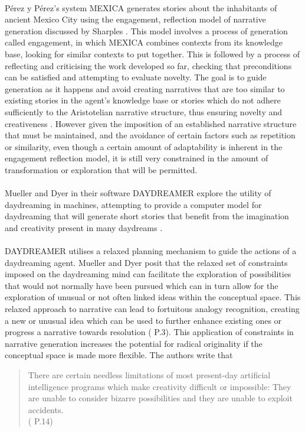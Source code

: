 \documentclass[letterpaper]{article}
\begin{document}
\\P\'erez y P\'erez's system MEXICA \cite{Perez2015} generates stories about the inhabitants of ancient Mexico City using the engagement, reflection model  of narrative generation discussed by Sharples \cite{Sharples96anaccount}. This model involves a process of generation called engagement, in which MEXICA combines contexts from its knowledge base, looking for similar contexts to put together. This is followed by a process of reflecting and criticising the work developed so far, checking that preconditions can be satisfied and attempting to evaluate novelty. The goal is to guide generation as it happens and avoid creating narratives that are too similar to existing stories in the agent's knowledge base or stories which do not adhere sufficiently to the Aristotelian narrative structure, thus ensuring novelty and creativeness \cite{Perez2015, PEREZYPEREZ200415}. However given the imposition of an established narrative structure that must be maintained, and the avoidance of certain factors such as repetition or similarity, even though a certain amount of adaptability is inherent in the engagement reflection model, it is still very constrained in the amount of transformation or exploration that will be permitted.\\
\\Mueller and Dyer in their software DAYDREAMER explore the utility of daydreaming in machines, attempting to provide a computer model for daydreaming that will generate short stories that benefit from the imagination and creativity present in many daydreams \cite{Mueller1985}.\\
\\DAYDREAMER utilises a relaxed planning mechanism to guide the actions of a daydreaming agent. Mueller and Dyer posit that the relaxed set of constraints imposed on the daydreaming mind can facilitate the exploration of possibilities that would not normally have been pursued which can in turn allow for the exploration of unusual or not often linked ideas within the conceptual space. This relaxed approach to narrative can lead to fortuitous analogy recognition, creating a new or unusual idea which can be used to further enhance existing ones or progress a narrative towards resolution (\cite{Mueller1985} P.3). This application of constraints in narrative generation increases the potential for radical originality if the conceptual space is made more flexible. The authors write that
\begin{quote}
There are certain needless limitations of most present-day artificial intelligence programs which make creativity difficult or impossible: They are unable to consider bizarre possibilities and they are unable to exploit accidents.\\
(\cite{Mueller:1990:DHM:77492} P.14)
\end{quote}
\end{document}

